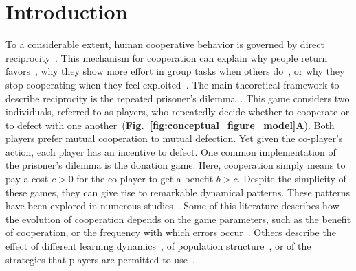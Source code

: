\documentclass[11pt]{article}
\newcommand{\figref}[1]{{\textbf{Fig.~\ref{#1}}}}
\begin{document}

\section*{Introduction}

To a considerable extent, human cooperative behavior is governed by direct reciprocity~\cite{melis:ptrs:2010,rand:TCS:2013}. 
This mechanism for cooperation can explain why people return favors~\citep{neilson:JEBO:1999}, why they show more effort in group tasks when others do~\citep{fischbacher:AER:2010}, or why they stop cooperating when they feel exploited~\citep{hilbe:ncomms:2014,Xu:NComms:2016}. 
The main theoretical framework to describe reciprocity is the repeated prisoner's dilemma~\cite{axelrod:AAAS:1981, nowak:Science:2006, sigmund2010,Garcia:FRAI:2018,hilbe:Nature:2018,Rossetti:ETH:2023}. 
This game considers two individuals, referred to as players, who repeatedly decide whether to cooperate or to defect with one another~(\figref{fig:conceptual_figure_model}\textbf{A}). 
Both players prefer mutual cooperation to mutual defection. 
Yet given the co-player's action, each player has an incentive to defect. 
One common implementation of the prisoner's dilemma is the donation game. 
Here, cooperation simply means to pay a cost $c\!>\!0$ for the co-player to get a benefit $b\!>\!c$. 
Despite the simplicity of these games, they can give rise to remarkable dynamical patterns. 
These patterns have been explored in numerous studies~\citep{frean:PRSB:1994,killingback:PRSB:1999,hauert:JTB:2002b,kurokawa:PRSB:2009,pinheiro:PLoSCB:2014,garcia:jet:2016,mcavoy:PRSA:2019,Kraines:TaD:1989,nowak:Nature:1993,imhof:PNAS:2005,grujic:jtb:2012,van-segbroeck:prl:2012,press:PNAS:2012,stewart:pnas:2013,Toupo:IJBC:2014,stewart:pnas:2014, akin:EGADS:2016,glynatsi:scientific:2020,chen:PNASnexus:2023}.
Some of this literature describes how the evolution of cooperation depends on the game parameters, such as the benefit of cooperation, or the frequency with which errors occur~\citep{boyd:JTB:1989,Hao:PRE:2015,Zhang:GEB:2018,Mamiya:PRE:2020}. 
Others describe the effect of different learning dynamics~\citep{stewart:games:2015,Mcavoy:PNAS:2022}, of population structure~\citep{brauchli:JTB:1999,szabo:PRE:2000b,allen:AmNat:2013,szolnoki:scirep:2014}, or of the strategies that players are permitted to use~\citep{baek:scientific:2016}.  
\end{document}
